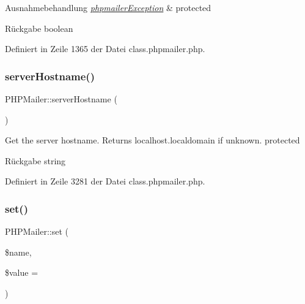 \begin{DoxyExceptions}{Ausnahmebehandlung}
{\em \mbox{\hyperlink{classphpmailer_exception}{phpmailer\+Exception}}} & protected \\
\hline
\end{DoxyExceptions}
\begin{DoxyReturn}{Rückgabe}
boolean 
\end{DoxyReturn}


Definiert in Zeile 1365 der Datei class.\+phpmailer.\+php.

\mbox{\label{class_p_h_p_mailer_a36f6955354169096bfe05a59565ae23c}} 
\subsubsection{\texorpdfstring{server\+Hostname()}{serverHostname()}}
{\footnotesize\ttfamily P\+H\+P\+Mailer\+::server\+Hostname (\begin{DoxyParamCaption}{ }\end{DoxyParamCaption})\hspace{0.3cm}{\ttfamily [protected]}}

Get the server hostname. Returns \textquotesingle{}localhost.\+localdomain\textquotesingle{} if unknown.  protected \begin{DoxyReturn}{Rückgabe}
string 
\end{DoxyReturn}


Definiert in Zeile 3281 der Datei class.\+phpmailer.\+php.

\mbox{\label{class_p_h_p_mailer_a71faad700fa71876e41d1118daf45a89}} 
\subsubsection{\texorpdfstring{set()}{set()}}
{\footnotesize\ttfamily P\+H\+P\+Mailer\+::set (\begin{DoxyParamCaption}\item[{}]{\$name,  }\item[{}]{\$value = {\ttfamily \textquotesingle{}\textquotesingle{}} }\end{DoxyParamCaption})}

